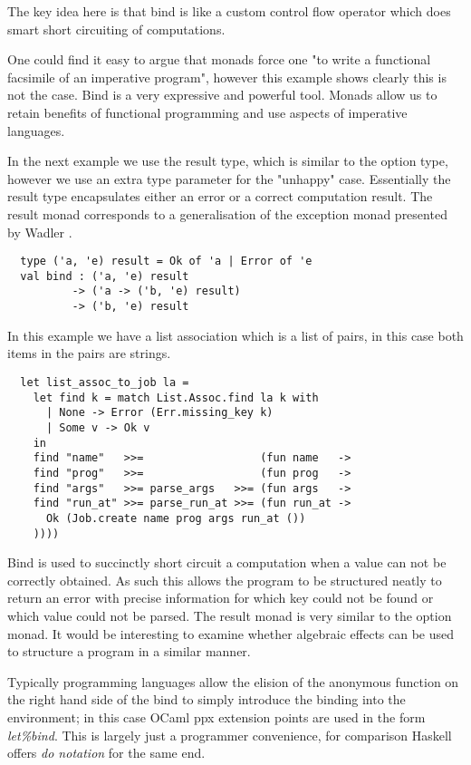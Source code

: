 The key idea here is that bind is like a custom control
flow operator which does smart short circuiting of
computations.

One could find it easy to argue that monads force one
"to write a functional facsimile of an imperative program",
however this example shows clearly this is not the case.
Bind is a very expressive and powerful tool.
Monads allow us to retain benefits of functional programming
and use aspects of imperative languages\cite{PeytonJones:1993}.

In the next example we use the result type,
which is similar to the option type, however we use an extra type
parameter for the "unhappy" case. Essentially the result type encapsulates
either an error or a correct computation result. The result monad
corresponds to a generalisation of the exception monad presented by Wadler \cite{wadler1995monads}.

\begin{verbatim}
  type ('a, 'e) result = Ok of 'a | Error of 'e
  val bind : ('a, 'e) result
          -> ('a -> ('b, 'e) result)
          -> ('b, 'e) result
\end{verbatim}

In this example we have a list association which is a list of pairs,
in this case both items in the pairs are strings.

\begin{verbatim}
  let list_assoc_to_job la =
    let find k = match List.Assoc.find la k with
      | None -> Error (Err.missing_key k)
      | Some v -> Ok v
    in
    find "name"   >>=                  (fun name   ->
    find "prog"   >>=                  (fun prog   ->
    find "args"   >>= parse_args   >>= (fun args   ->
    find "run_at" >>= parse_run_at >>= (fun run_at ->
      Ok (Job.create name prog args run_at ())
    ))))
\end{verbatim}

Bind is used to succinctly short circuit a computation when a value can not be
correctly obtained. As such this allows the program to be structured neatly to return
an error with precise information for which key could not be found or which value could
not be parsed. The result monad is very similar to the option monad. It would be interesting
to examine whether algebraic effects can be used to structure a program in a similar manner.

Typically programming languages allow the elision of the anonymous function on the right hand side
of the bind to simply introduce the binding into the environment;
in this case OCaml ppx extension points are used in the form \textit{let\%bind}.
This is largely just a programmer convenience,
for comparison Haskell offers \textit{do notation} for the same end.

